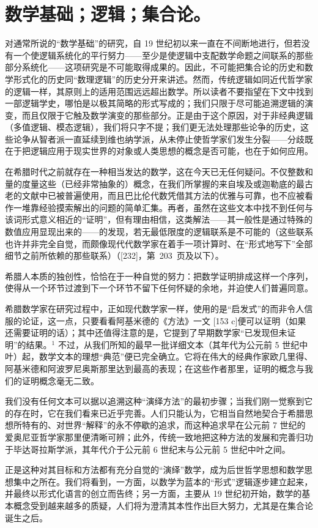 \chapter{数学基础；逻辑；集合论。}

对通常所说的“数学基础”的研究，自 19 世纪初以来一直在不间断地进行，但若没有一个使逻辑系统化的平行努力——至少是使逻辑中支配数学命题之间联系的那些部分系统化——这项研究是不可能取得成果的。因此，不可能把集合论的历史和数学形式化的历史同“数理逻辑”的历史分开来讲述。然而，传统逻辑如同近代哲学家的逻辑一样，其原则上的适用范围远远超出数学。所以读者不要指望在下文中找到一部逻辑学史，哪怕是以极其简略的形式写成的；我们只限于尽可能追溯逻辑的演变，而且仅限于它触及数学演变的那些部分。正是由于这个原因，对于非经典逻辑（多值逻辑、模态逻辑），我们将只字不提；我们更无法处理那些论争的历史，这些论争从智者派一直延续到维也纳学派，从未停止使哲学家们发生分裂——分歧既在于把逻辑应用于现实世界的对象或人类思想的概念是否可能，也在于如何应用。

在希腊时代之前就存在一种相当发达的数学，这在今天已无任何疑问。不仅整数和量的度量这些（已经非常抽象的）概念，在我们所掌握的来自埃及或迦勒底的最古老的文献中已被普遍使用，而且巴比伦代数凭借其方法的优雅与可靠，也不应被看作一堆靠经验摸索解出的问题的简单汇集。再者，虽然在这些文本中找不到任何与该词形式意义相近的“证明”，但有理由相信，这类解法——其一般性是通过特殊的数值应用显现出来的——的发现，若无最低限度的逻辑联系是不可能的（这些联系也许并非完全自觉，而颇像现代代数学家在着手一项计算时、在“形式地写下”全部细节之前所依赖的那些联系）（{[}232{]}，第~203~页及以下）。

希腊人本质的独创性，恰恰在于一种自觉的努力：把数学证明排成这样一个序列，使得从一个环节过渡到下一个环节不留下任何怀疑的余地，并迫使人们普遍同意。

希腊数学家在研究过程中，正如现代数学家一样，使用的是“启发式”的而非令人信服的论证，这一点，只要看看阿基米德的《方法》一文 {[}153 c{]}便可以证明（如果还需要证明的话）；其中还值得注意的是，它提到了早期数学家“已发现但未证明”的结果。\(^{1}\) 不过，从我们所知的最早一批详细文本（其年代为公元前 5 世纪中叶）起，数学文本的理想“典范”便已完全确立。它将在伟大的经典作家欧几里得、阿基米德和阿波罗尼奥斯那里达到最高的表现；在这些作者那里，证明的概念与我们的证明概念毫无二致。

我们没有任何文本可以据以追溯这种“演绎方法”的最初步骤；当我们刚一觉察到它的存在时，它在我们看来已近乎完善。人们只能认为，它相当自然地契合于希腊思想所特有的、对世界“解释”的永不停歇的追求，而这种追求早在公元前 7 世纪的爱奥尼亚哲学家那里便清晰可辨；此外，传统一致地把这种方法的发展和完善归功于毕达哥拉斯学派，其年代介于公元前 6 世纪末与公元前 5 世纪中叶之间。

正是这种对其目标和方法都有充分自觉的“演绎”数学，成为后世哲学思想和数学思想集中之所在。我们将看到，一方面，以数学为蓝本的“形式”逻辑逐步建立起来，并最终以形式化语言的创立而告终；另一方面，主要从 19 世纪初开始，数学的基本概念受到越来越多的质疑，人们将为澄清其本性作出巨大努力，尤其是在集合论诞生之后。

